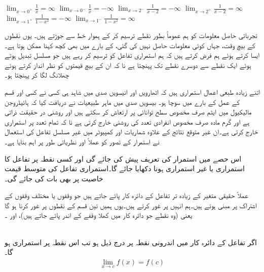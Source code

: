 $\lim_{x\to 0^+}\tfrac{1}{x}=\infty$
$\lim_{x\to 0^-}\tfrac{1}{x}=-\infty$
$\lim_{x\to 2^-}\tfrac{1}{x-2}=-\infty$
$\lim_{x\to 2^+}\tfrac{1}{x-2}=\infty$
$\lim_{x\to 1^+}\tfrac{1}{1-x^2}=-\infty$
$\lim_{x\to 1^-}\tfrac{1}{1-x^2}=\infty$

تجرباتی حاصل معلومات  کو ہم عموماً بطور نقطے ترسیم کر کے  ہموار خط سے جوڑتے ہیں۔ یوں نقطوں کے بیچ وقت، جہاں کوئی معلومات حاصل نہیں کی گئی، کے بارے میں بھی کچھ کہنا ممکن ہوتا ہے۔ایسا کرتے ہوئے ہم فرض کرتے ہیں کہ ہم استمراری تفاعل کو ترسیم کر رہے ہیں جو مسلسل تبدیل ہوتے ہوئے ایک نقطے سے دوسرے نقطے تک پہنچتا ہے نا کہ ان کے بیچ قیمتوں کو نظر انداز کرتے ہوئے چھلانگ لگا کر پہنچتا ہو۔   

اتنے زیادہ طبعی اعمال  استمراری ہیں کہ اٹھارویں اور  انیسویں  صدی میں شاہد ہی کسی نے کسی اور قسم کے عمل کے بارے میں سوچا ہو۔ بیسویں صدی میں ماہر طبیعیات نے دریافت کیا کہ ہائیڈروجن  مالیکیول میں ایٹم صرف مخصوص سطح توانائی پر ارتعاش کر سکتے ہیں اور روشنی در حقیقت ذراتی ہے اور گرم مادہ صرف مخصوص انفرادی تعدد کی روشنی خارج کرتی ہے نا کہ تمام تعدد پر استمراری خارج کرتی ہے۔ان غیر متوقع نتائج کے علاوہ شماریات اور  کمپیوٹر میں غیر مسلسل  تفاعل کی استعمال نے استمرار کے تصور کو عملاً اور نظریاتی طور پر اہم بنایا ہے۔

اس حصے میں استمرار کی تعریف پیش کی جائے گی اور کسی نقطہ پر تفاعل کا استمراری یا غیر استمراری ہونا دکھایا جائے گا۔استمراری تفاعل کی متوسط قیمت خاصیت پر بھی بات کی جائے گی۔

عملاً حقیقی متغیر کے زیادہ تر تفاعل کے دائرہ کار پائے جاتے ہیں جو وقفوں یا مختلف وقفوں کے اشتراک پر مبنی ہوتے ہیں۔ہم انہیں پر غور کرتے ہیں۔یوں ہمیں تین قسم کے نقطوں پر غور کرنا ہو گا یعنی  (وہ نقطے جو دائرہ کار میں کھلا وقفے  کے اندر پائے جاتے ہیں)،  اور ۔

\\
اگر تفاعل  کے دائرہ کار میں اندرونی نقطہ  پر درج ذیل ہو تب اس نقطہ پر  استمراری ہو گا۔
\begin{align*}
\lim_{x\to c}f(x)=f(c)
\end{align*}

